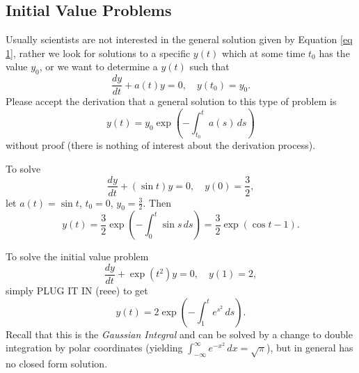 \subsection{Initial Value Problems}
Usually scientists are not interested in the general solution given by Equation \eqref{eq 1}, rather we look for solutions to a specific $y(t)$ which at some time $t_0$ has the value $y_0$, or we want to determine a $y(t)$ such that \[
    \frac{dy}{dt}+a(t)y=0, \quad y(t_0)=y_0.
\]
Please accept the derivation that a general solution to this type of problem is 
\begin{equation}\label{eq_2}
    y(t)=y_0\exp\left( -\int_{t_0}^{t} a(s) \, ds \right)  
\end{equation}
without proof (there is nothing of interest about the derivation process).
\begin{example}
    To solve \[
        \frac{dy}{dt}+(\sin t)y=0, \quad y(0)=\frac{3}{2},
    \]
    let  $a(t)=\sin t$, $t_0=0$, $y_0=\frac{3}{2}$. Then \[
        y(t)=\frac{3}{2}\exp\left( -\int_{0}^{t} \sin s \, ds \right)  =\frac{3}{2} \exp \left( \cos t - 1 \right).
    \]
\end{example}
\begin{example}
    To solve the initial value problem \[
        \frac{dy}{dt}+ \exp(t^2)y=0, \quad y(1)=2,
    \]
    simply PLUG IT IN (reee) to get \[
        y(t)=2\exp\left( -\int_{1}^{t} e^{s^2} \, ds \right).
    \]
    Recall that this is the \emph{Gaussian Integral} and can be solved by a change to double integration by polar coordinates (yielding $\int_{-\infty}^{\infty} e^{-x^2} \, dx = \sqrt{\pi}$), but in general has no closed form solution.
\end{example}

